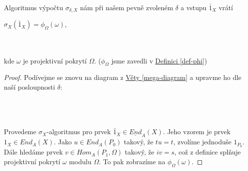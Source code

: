       \begin{lem}\label{alg-vraci}
        Algoritmus výpočtu $\sigma_{\delta,X}$ nám při našem pevně zvoleném $\delta$ a 
        vstupu $\bar{1}_X$ vrátí \\
        \centerline{ $\sigma_{X}(\bar{1}_X)=\phi_\Omega(\omega)$,}\\\\
        kde $\omega$ je projektivní pokrytí $\Omega$. ($\phi_\Omega$
        jsme zavedli v \hyperref[def-phi]{Definici \ref*{def-phi}}) 
      \end{lem}
      \begin{proof}
        Podívejme se znovu na diagram z \hyperref[mega-diagram]{Věty \ref*{mega-diagram}} a 
        upravme ho dle naší posloupnosti $\delta$: \\\\
      \centerline{}\\\\
      Provedeme $\sigma_X$-algoritmus pro prvek $\bar 1_X\in \underline{End}_A(X)$. 
      Jeho vzorem je prvek $1_X\in {End}_A(X)$. Jako $u\in {End}_A(P_0)$ takový, 
      že $tu=t$, zvolíme jednoduše $1_{P_0}$. Dále hledáme prvek $v\in Hom_A(P_1,\Omega)$ 
      takový, že $iv=s$, což z definice splňuje projektivní pokrytí $\omega$ 
      modulu $\Omega$. To pak zobrazíme na $\phi_\Omega(\omega)$.
      \end{proof}
      
